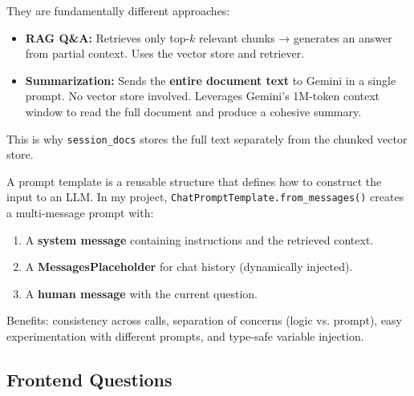 \documentclass[12pt,a4paper]{article}
\begin{document}
\begin{interviewbox}
\end{interviewbox}
\begin{answerbox}
They are fundamentally different approaches:
\begin{itemize}
  \item \textbf{RAG Q\&A:} Retrieves only top-$k$ relevant chunks → generates an answer from partial context. Uses the vector store and retriever.
  \item \textbf{Summarization:} Sends the \textbf{entire document text} to Gemini in a single prompt. No vector store involved. Leverages Gemini's 1M-token context window to read the full document and produce a cohesive summary.
\end{itemize}
This is why \texttt{session\_docs} stores the full text separately from the chunked vector store.
\end{answerbox}

\begin{interviewbox}
\end{interviewbox}
\begin{answerbox}
A prompt template is a reusable structure that defines how to construct the input to an LLM. In my project, \texttt{ChatPromptTemplate.from\_messages()} creates a multi-message prompt with:
\begin{enumerate}
  \item A \textbf{system message} containing instructions and the retrieved context.
  \item A \textbf{MessagesPlaceholder} for chat history (dynamically injected).
  \item A \textbf{human message} with the current question.
\end{enumerate}
Benefits: consistency across calls, separation of concerns (logic vs. prompt), easy experimentation with different prompts, and type-safe variable injection.
\end{answerbox}

\subsection{Frontend Questions}
\end{document}
